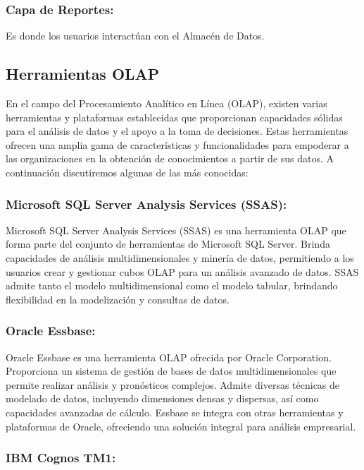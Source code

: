 \subsubsection{Capa de Reportes:} Es donde los usuarios interact\'uan con el Almac\'en de Datos.

\subsection{Herramientas OLAP}

En el campo del Procesamiento Analítico en Línea (OLAP), existen varias herramientas y plataformas establecidas que 
proporcionan capacidades sólidas para el análisis de datos y el apoyo a la toma de decisiones. Estas herramientas ofrecen 
una amplia gama de características y funcionalidades para empoderar a las organizaciones en la obtención de conocimientos a 
partir de sus datos. A continuaci\'on discutiremos algunas de las m\'as conocidas: 

\subsubsection{Microsoft SQL Server Analysis Services (SSAS): }

Microsoft SQL Server Analysis Services (SSAS) es una herramienta OLAP que forma parte del conjunto de herramientas 
de Microsoft SQL Server. Brinda capacidades de análisis multidimensionales y minería de datos, permitiendo a los 
usuarios crear y gestionar cubos OLAP para un análisis avanzado de datos. SSAS admite tanto el modelo multidimensional 
como el modelo tabular, brindando flexibilidad en la modelización y consultas de datos.

\subsubsection{Oracle Essbase: }

Oracle Essbase es una herramienta OLAP ofrecida por Oracle Corporation. Proporciona un sistema de gestión de bases de datos 
multidimensionales que permite realizar análisis y pronósticos complejos. Admite diversas técnicas de modelado de datos, incluyendo 
dimensiones densas y dispersas, así como capacidades avanzadas de cálculo. Essbase se integra con otras herramientas y 
plataformas de Oracle, ofreciendo una solución integral para análisis empresarial.

\subsubsection{IBM Cognos TM1: }

